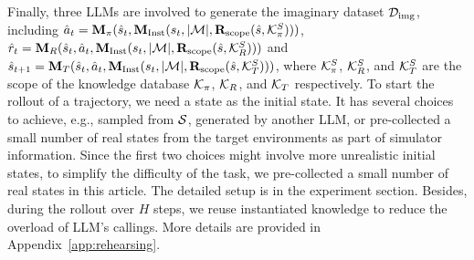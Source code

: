 Finally, three LLMs are involved to generate the imaginary dataset $\mathcal{D}_{\rm img}$, including $\hat a_{t}=\mathbf{M}_{\pi}(\hat s_t, \mathbf{M}_{\rm Inst}(s_t, |\mathcal{M}|, \mathbf{R}_{\rm scope}({\hat s}, \mathcal{K}_{\pi}^S)))$, $\hat r_{t}=\mathbf{M}_{R}(\hat s_t, \hat a_t, \mathbf{M}_{\rm Inst}(s_t, |\mathcal{M}|, \mathbf{R}_{\rm scope}({\hat s}, \mathcal{K}_{R}^S)))$ and~$\hat s_{t+1}=\mathbf{M}_{T}(\hat s_t, \hat a_{t}, \mathbf{M}_{\rm Inst}(s_t, |\mathcal{M}|, \mathbf{R}_{\rm scope}({\hat s}, \mathcal{K}_{T}^S)))$, where $\mathcal{K}_{\pi}^S$, $\mathcal{K}_{R}^S$, and $\mathcal{K}_{T}^S$ are the scope of the knowledge database $\mathcal{K}_{\pi}$, $\mathcal{K}_{R}$, and $\mathcal{K}_{T}$ respectively. To start the rollout of a trajectory, we need a state as the initial state. It has several choices to achieve, e.g., sampled from ${\mathcal{S}}$, generated by another LLM, or pre-collected a small number of real states from the target environments as part of simulator information. Since the first two choices might involve more unrealistic initial states, to simplify the difficulty of the task, we pre-collected a small number of real states in this article. The detailed setup is in the experiment section. Besides, during the rollout over $H$ steps, we reuse instantiated knowledge to reduce the overload of LLM's callings. More details are provided in Appendix~\ref{app:rehearsing}.
  

